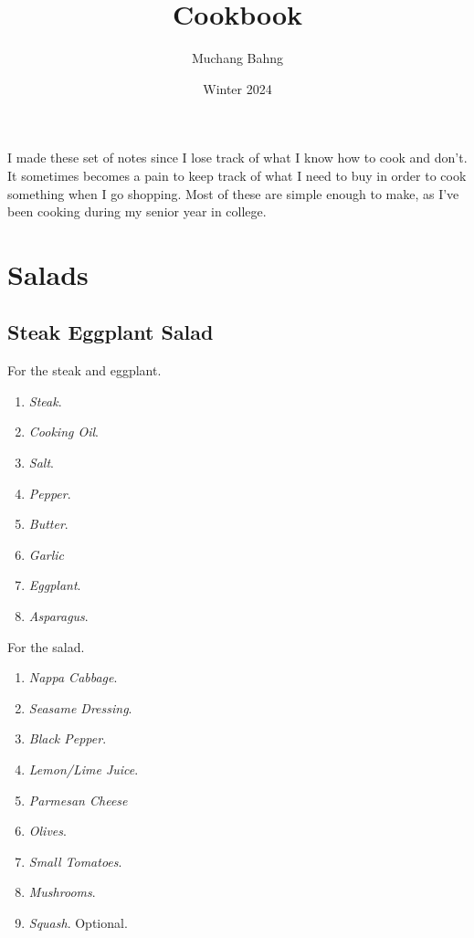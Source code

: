 \documentclass{article}
\begin{document}
\title{Cookbook}
\author{Muchang Bahng}
\date{Winter 2024}

\maketitle
\tableofcontents
\pagebreak

I made these set of notes since I lose track of what I know how to cook and don't. It sometimes becomes a pain to keep track of what I need to buy in order to cook something when I go shopping. Most of these are simple enough to make, as I've been cooking during my senior year in college.  

\section{Salads} 

  \subsection{Steak Eggplant Salad} 

    \begin{definition}
      For the steak and eggplant.  
      \begin{enumerate}
        \item \textit{Steak}. 
        \item \textit{Cooking Oil}. 
        \item \textit{Salt}. 
        \item \textit{Pepper}. 
        \item \textit{Butter}. 
        \item \textit{Garlic}
        \item \textit{Eggplant}. 
        \item \textit{Asparagus}. 
      \end{enumerate}
      For the salad. 
      \begin{enumerate}
        \item \textit{Nappa Cabbage}. 
        \item \textit{Seasame Dressing}. 
        \item \textit{Black Pepper}. 
        \item \textit{Lemon/Lime Juice}. 
        \item \textit{Parmesan Cheese}
        \item \textit{Olives}. 
        \item \textit{Small Tomatoes}. 
        \item \textit{Mushrooms}. 
        \item \textit{Squash}. Optional. 
      \end{enumerate}
    \end{definition}
\end{document}
